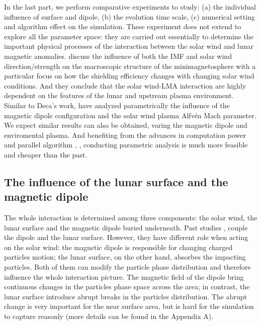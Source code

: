 In the last part, we perform comparative experiments to study: (a) the individual influence of surface and dipole, (b) the evolution time scale, (c) numerical setting and algorithm effect on the simulation. These experiment does not extend to explore all the parameter space: they are carried out essentially to determine the important physical processes of the interaction between the solar wind and lunar magnetic anomalies. \cite{decaGeneralMechanismDynamics2015} discuss the influence of both the IMF and solar wind direction/strength on the macroscopic structure of the minimagnetosphere with a particular focus on how the shielding efficiency changes with changing solar wind conditions. And they conclude that the solar wind-LMA interaction  are highly dependent on the features of the lunar and upstream plasma environment. Similar to Deca's work, \cite{bamford3DPICSIMULATIONS2016} have analyzed parametrically the influence of the magnetic dipole configuration and the solar wind plasma Alfvén Mach parameter. We expect similar results can also be obtained, varing the magnetic dipole and enviromental plasma. And benefiting from the advances in computation power and parallel algorithm \citep{zhangAMReXFrameworkBlockstructured2019}, \cite{zhangAMReXBlockstructuredAdaptive2021}, conducting parametric analysis is much more feasible and cheaper than the past.


\subsection{The influence of the lunar surface and the magnetic dipole}

The whole interaction is determined among three components: the solar wind, the lunar surface and the magnetic dipole buried underneath. Past studies \citep{decaGeneralMechanismDynamics2015}, \cite{bamford3DPICSIMULATIONS2016} couple the dipole and the lunar surface. However, they have different role when acting on the solar wind: the magnetic dipole is responsible for changing charged particles motion; the lunar surface, on the other hand, absorbes the impacting particles. Both of them can modify the particle phase distribution and therefore influence the whole interaction picture. The magnetic field of the dipole bring continuous changes in the particles phase space across the area; in contrast, the lunar surface introduce abrupt breaks in the particles distribution. The abrupt change is very important for the near surface area, but is hard for the simulation to capture reasonly (more details can be found in the Appendix A).

